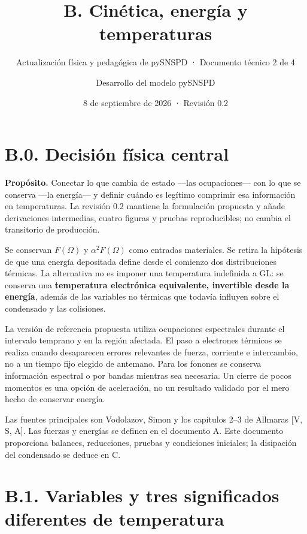 \documentclass[
  spanish,
  10pt,
  a4paper,
]{article}
\title{B. Cinética, energía y temperaturas}
\subtitle{Actualización física y pedagógica de pySNSPD · Documento
técnico 2 de 4}
\author{Desarrollo del modelo pySNSPD}
\date{8 de septiembre de 2026 · Revisión 0.2}
\newcounter{none} %
\begin{document}
\maketitle

{
\setcounter{tocdepth}{2}
\tableofcontents
}
\newpage

\section{B.0. Decisión física
central}\label{b.0.-decisiuxf3n-fuxedsica-central}

\textbf{Propósito.} Conectar lo que cambia de estado ---las
ocupaciones--- con lo que se conserva ---la energía--- y definir cuándo
es legítimo comprimir esa información en temperaturas. La revisión 0.2
mantiene la formulación propuesta y añade derivaciones intermedias,
cuatro figuras y pruebas reproducibles; no cambia el transitorio de
producción.

Se conservan \(F(\Omega)\) y \(\alpha^2F(\Omega)\) como entradas
materiales. Se retira la hipótesis de que una energía depositada define
desde el comienzo dos distribuciones térmicas. La alternativa no es
imponer una temperatura indefinida a GL: se conserva una
\textbf{temperatura electrónica equivalente, invertible desde la
energía}, además de las variables no térmicas que todavía influyen sobre
el condensado y las colisiones.

La versión de referencia propuesta utiliza ocupaciones espectrales
durante el intervalo temprano y en la región afectada. El paso a
electrones térmicos se realiza cuando desaparecen errores relevantes de
fuerza, corriente e intercambio, no a un tiempo fijo elegido de
antemano. Para los fonones se conserva información espectral o por
bandas mientras sea necesaria. Un cierre de pocos momentos es una opción
de aceleración, no un resultado validado por el mero hecho de conservar
energía.

Las fuentes principales son Vodolazov, Simon y los capítulos 2--3 de
Allmaras {[}V, S, A{]}. Las fuerzas y energías se definen en el
documento A. Este documento proporciona balances, reducciones, pruebas y
condiciones iniciales; la disipación del condensado se deduce en C.

\section{B.1. Variables y tres significados diferentes de
temperatura}\label{b.1.-variables-y-tres-significados-diferentes-de-temperatura}
\end{document}
